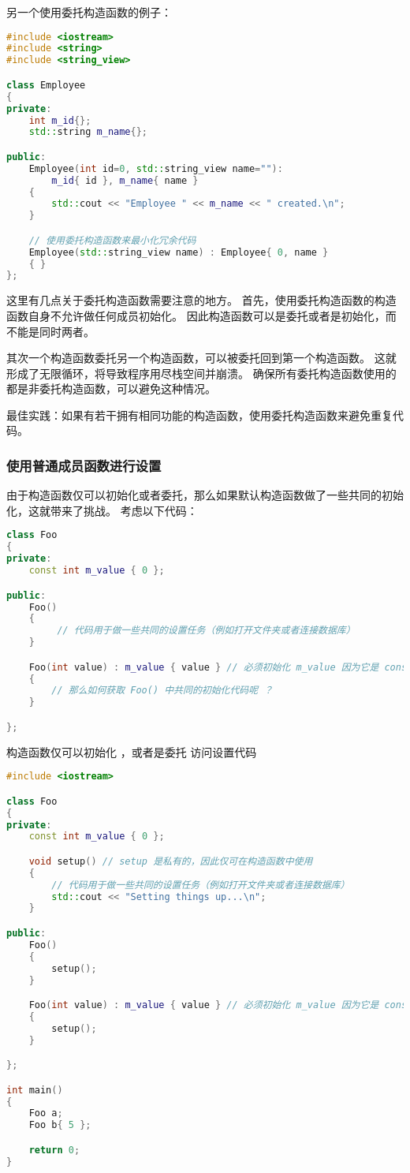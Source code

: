 \documentclass[../../LearnCpp.tex]{subfiles}
\begin{document}
另一个使用委托构造函数的例子：

\begin{lstlisting}[language=C++]
#include <iostream>
#include <string>
#include <string_view>

class Employee
{
private:
    int m_id{};
    std::string m_name{};

public:
    Employee(int id=0, std::string_view name=""):
        m_id{ id }, m_name{ name }
    {
        std::cout << "Employee " << m_name << " created.\n";
    }

    // 使用委托构造函数来最小化冗余代码
    Employee(std::string_view name) : Employee{ 0, name }
    { }
};
\end{lstlisting}

这里有几点关于委托构造函数需要注意的地方。
首先，使用委托构造函数的构造函数自身不允许做任何成员初始化。
因此构造函数可以是委托或者是初始化，而不能是同时两者。

其次一个构造函数委托另一个构造函数，可以被委托回到第一个构造函数。
这就形成了无限循环，将导致程序用尽栈空间并崩溃。
确保所有委托构造函数使用的都是非委托构造函数，可以避免这种情况。

最佳实践：如果有若干拥有相同功能的构造函数，使用委托构造函数来避免重复代码。

\subsubsection*{使用普通成员函数进行设置}

由于构造函数仅可以初始化或者委托，那么如果默认构造函数做了一些共同的初始化，这就带来了挑战。
考虑以下代码：

\begin{lstlisting}[language=C++]
class Foo
{
private:
    const int m_value { 0 };

public:
    Foo()
    {
         // 代码用于做一些共同的设置任务（例如打开文件夹或者连接数据库）
    }

    Foo(int value) : m_value { value } // 必须初始化 m_value 因为它是 const
    {
        // 那么如何获取 Foo() 中共同的初始化代码呢 ？
    }

};
\end{lstlisting}

 构造函数仅可以初始化 ，或者是委托  访问设置代码

\begin{lstlisting}[language=C++]
#include <iostream>

class Foo
{
private:
    const int m_value { 0 };

    void setup() // setup 是私有的，因此仅可在构造函数中使用
    {
        // 代码用于做一些共同的设置任务（例如打开文件夹或者连接数据库）
        std::cout << "Setting things up...\n";
    }

public:
    Foo()
    {
        setup();
    }

    Foo(int value) : m_value { value } // 必须初始化 m_value 因为它是 const
    {
        setup();
    }

};

int main()
{
    Foo a;
    Foo b{ 5 };

    return 0;
}
\end{lstlisting}
\end{document}
